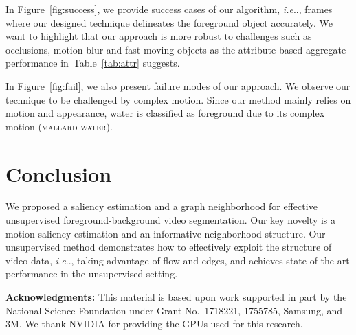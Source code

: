 \documentclass[runningheads]{llncs}
\makeatletter
\newcommand\para[1]{\noindent{#1}}
\def\@onedot{\ifx\@let@token.\else.\null\fi\xspace}
\DeclareRobustCommand\onedot{\futurelet\@let@token\@onedot}
\newcommand{\figref}[1]{Figure~\ref{#1}}
\newcommand{\tabref}[1]{Table~\ref{#1}}
\def\ie{\emph{i.e}\onedot} \def\Ie{\emph{I.e}\onedot}
\makeatother
\begin{document}
\para{\bf Success cases:}
In \figref{fig:success}, we provide success cases of our algorithm, \ie, frames where our designed technique delineates the foreground object accurately. We want to highlight that our approach is more robust to challenges such as occlusions, motion blur and fast moving objects as the attribute-based aggregate performance in~\tabref{tab:attr} suggests.

\para{\bf Failure modes:}
In \figref{fig:fail}, we also present failure modes of our approach. We observe our technique to be challenged by complex motion. Since our method mainly relies on motion and appearance, water is classified as foreground due to its complex motion (\textsc{mallard-water}). %
 \section{Conclusion}
We proposed a saliency estimation and a graph neighborhood for effective unsupervised foreground-background video segmentation. Our key novelty is a motion saliency estimation and an informative neighborhood structure. Our unsupervised method demonstrates how to effectively exploit the structure of video data, \ie, taking advantage of flow and edges, and achieves state-of-the-art performance in the unsupervised setting.

\noindent\textbf{Acknowledgments:} This material is based upon work supported in part by the National Science Foundation under Grant No.~1718221, 1755785, Samsung, and 3M. We thank NVIDIA for providing the GPUs used for this research.

 
\clearpage



\end{document}
